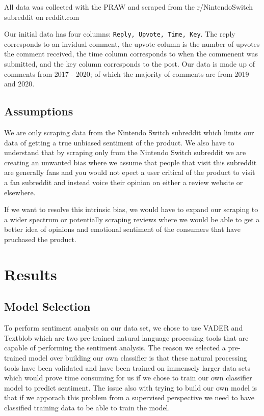 \documentclass{report}
\begin{document}
All data was collected with the PRAW and scraped from the r/NintendoSwitch subreddit on reddit.com

Our initial data has four columns: \texttt{Reply, Upvote, Time, Key}. The reply corresponds to an invidual comment, the upvote column is the number of upvotes the comment received, the time column
corresponds to when the commenent was submitted, and the key column corresponds to the post. Our data is made up of comments from 2017 - 2020; of which the majority of comments are from 2019 and 2020. 

\section{Assumptions}

We are only scraping data from the Nintendo Switch subreddit which limits our data of getting a true unbiased sentiment of the product. We also have to understand that by scraping only from the Nintendo Switch
subreddit we are creating an unwanted bias where we assume that people that visit this subreddit are generally fans and you would not epect a user critical of the product to visit a fan subreddit and instead
voice their opinion on either a review website or elsewhere.

If we want to resolve this intrinsic bias, we would have to expand our scraping to a wider spectrum or potentially scraping reviews where we would be able to get a better idea of opinions and emotional sentiment
of the consumers that have pruchased the product.

\chapter{Results}
\section{Model Selection}

To perform sentiment analysis on our data set, we chose to use VADER and Textblob which are two pre-trained natural language processing tools that are capable of performing the sentiment analysis. The
reason we selected a pre-trained model over building our own classifier is that these natural processing tools have been validated and have been trained on immensely larger data sets which would prove
time consuming for us if we chose to train our own classifier model to predict sentiment. The issue also with trying to build our own model is that if we apporach this problem from a supervised perspective
we need to have classified training data to be able to train the model.
\end{document}
